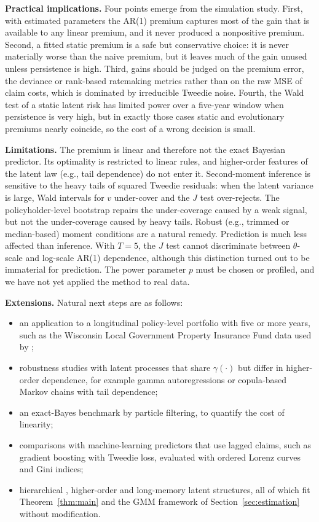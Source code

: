 \documentclass[mathematics,article,submit,moreauthors]{Definitions/mdpi}
\begin{document}
\textbf{Practical implications.} Four points emerge from the simulation study. First, with estimated parameters the AR(1) premium captures most of the gain that is available to any linear premium, and it never produced a nonpositive premium. Second, a fitted static premium is a safe but conservative choice: it is never materially worse than the naive premium, but it leaves much of the gain unused unless persistence is high. Third, gains should be judged on the premium error, the deviance or rank-based ratemaking metrics rather than on the raw MSE of claim costs, which is dominated by irreducible Tweedie noise. Fourth, the Wald test of a static latent risk has limited power over a five-year window when persistence is very high, but in exactly those cases static and evolutionary premiums nearly coincide, so the cost of a wrong decision is small.

\textbf{Limitations.} The premium is linear and therefore not the exact Bayesian predictor. Its optimality is restricted to linear rules, and higher-order features of the latent law (e.g., tail dependence) do not enter it. Second-moment inference is sensitive to the heavy tails of squared Tweedie residuals: when the latent variance is large, Wald intervals for $v$ under-cover and the $J$ test over-rejects. The policyholder-level bootstrap repairs the under-coverage caused by a weak signal, but not the under-coverage caused by heavy tails. Robust (e.g., trimmed or median-based) moment conditions are a natural remedy. Prediction is much less affected than inference. With $T=5$, the $J$ test cannot discriminate between $\theta$-scale and log-scale AR(1) dependence, although this distinction turned out to be immaterial for prediction. The power parameter $p$ must be chosen or profiled, and we have not yet applied the method to real data.

\textbf{Extensions.} Natural next steps are as follows:
\begin{itemize}
\item an application to a longitudinal policy-level portfolio with five or more years, such as the Wisconsin Local Government Property Insurance Fund data used by \citet{frees2016multivariate};
\item robustness studies with latent processes that share $\gamma(\cdot)$ but differ in higher-order dependence, for example gamma autoregressions or copula-based Markov chains with tail dependence;
\item an exact-Bayes benchmark by particle filtering, to quantify the cost of linearity;
\item comparisons with machine-learning predictors that use lagged claims, such as gradient boosting with Tweedie loss, evaluated with ordered Lorenz curves and Gini indices;
\item hierarchical \citep{taylor2018}, higher-order and long-memory \citep{pinquet2020} latent structures, all of which fit Theorem~\ref{thm:main} and the GMM framework of Section~\ref{sec:estimation} without modification.
\end{itemize}
\end{document}

